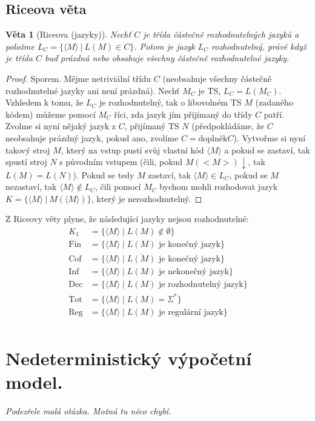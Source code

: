\documentclass[11pt]{report} %
\newtheorem{theorem}{Věta}[section]
\numberwithin{equation}{section}
\begin{document}
\subsection{Riceova věta}
\begin{theorem}[Riceova (jazyky)]
	Nechť $C$ je třída částečně rozhodnutelných jazyků a položme $L_C = \{\langle M\rangle\ |\ L(M) \in C\}$. Potom je jazyk $L_C$ rozhodnutelný, právě když je třída $C$ buď prázdná nebo obsahuje všechny částečně rozhodnutelné jazyky.
\end{theorem}
\begin{proof}
	Sporem. Mějme netriviální třídu $C$ (neobsahuje všechny částečně rozhodnutelné jazyky ani není prázdná). Nechť $M_C$ je TS, $L_C = L(M_C)$. Vzhledem k tomu, že $L_C$ je rozhodnutelný, tak o libovolném TS $M$ (zadaného kódem) můžeme pomocí $M_C$ říci, zda jazyk jím přijímaný do třídy $C$ patří. Zvolme si nyní nějaký jazyk z $C$, přijímaný TS $N$ (předpokládáme, že $C$ neobsahuje prázdný jazyk, pokud ano, zvolíme $C = \text{doplněk} C$). Vytvořme si nyní takový stroj $M$, který na vstup pustí svůj vlastní kód $\langle M \rangle$ a pokud se zastaví, tak spustí stroj $N$ s původním vstupem (čili, pokud $M(<M>){\downarrow}$, tak $L(M) = L(N)$). Pokud se tedy $M$ zastaví, tak $\langle M\rangle \in L_C$, pokud se $M$ nezastaví, tak $\langle M\rangle \notin L_C$, čili pomocí $M_C$ bychom mohli rozhodovat jazyk $K=\{\langle M\rangle\ |\ M(\langle M\rangle)\}$, který je nerozhodnutelný.	
\end{proof}

Z Riceovy věty plyne, že následující jazyky nejsou rozhodnutelné:
\begin{align*}
	K_1  &= \{\langle M\rangle \mid L(M) \notin \emptyset\} \\
	\text{Fin} &= \{\langle M\rangle \mid L(M) \text{ je konečný jazyk} \} \\
	\text{Cof} &= \{\langle M\rangle \mid \overline{L(M)} \text{ je konečný jazyk} \} \\
	\text{Inf} &= \{\langle M\rangle \mid L(M) \text{ je nekonečný jazyk}\} \\
	\text{Dec} &= \{\langle M\rangle \mid L(M) \text{ je rozhodnutelný jazyk}\} \\
	\text{Tot} &= \{\langle M\rangle \mid L(M) = \Sigma^*\} \\
	\text{Reg} &= \{\langle M\rangle \mid L(M) \text{ je regulární jazyk}\} \\
\end{align*}


\section{Nedeterministický výpočetní model.}
\textit{Podezřele malá otázka. Možná tu něco chybí.}
\end{document}
